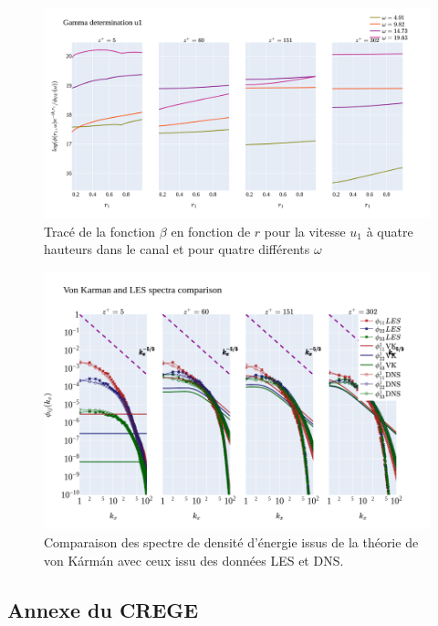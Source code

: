 \documentclass[12pt]{article}   %
\theoremstyle{plain}
\theoremstyle{remark}
\begin{document}
\begin{figure}[H]
	\begin{center}
		\includegraphics[width=0.9\linewidth]{../../output/figures/channel_wrles_retau395/split_time/gamma/gamma_u1_r.png}
		\caption{Tracé de la fonction $\beta$ en fonction de $r$ pour la vitesse $u_1$ à quatre hauteurs dans le canal et pour quatre différents $\omega$}
		\label{fig:gamma_r}
	\end{center}
\end{figure}

\begin{figure}[H]
	\begin{center}
		\includegraphics[width=0.9\linewidth]{../../output/figures/channel_wrles_retau395/split_time/von_karman/von_karman_spectra.png}
		\caption{Comparaison des spectre de densité d'énergie issus de la théorie de von Kármán avec ceux issu des données LES et DNS.}
		\label{fig:vk_spectra_zoom}
	\end{center}
\end{figure}

\pagebreak


\subsection{Annexe du CREGE}
\end{document}
